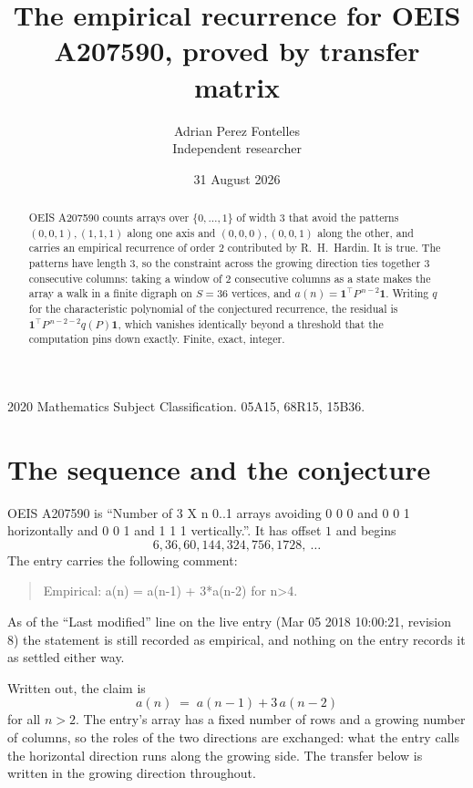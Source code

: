 \documentclass[11pt,a4paper]{article}
\title{The empirical recurrence for OEIS A207590, proved by transfer matrix}
\author{Adrian Perez Fontelles\\ \small Independent researcher}
\date{31 August 2026}
\theoremstyle{plain}
\theoremstyle{definition}
\begin{document}
\maketitle

\begin{abstract}
OEIS A207590 counts arrays over $\{0,\dots,1\}$ of width $3$ that avoid the patterns
$(0,0,1), (1,1,1)$ along one axis and $(0,0,0), (0,0,1)$ along the other, and carries an empirical recurrence of
order $2$ contributed by R.~H.~Hardin. It is true. The patterns have length $3$, so
the constraint across the growing direction ties together $3$ consecutive columns: taking a
window of $2$ consecutive columns as a state makes the array a walk in a finite digraph
on $S=36$ vertices, and $a(n)=\mathbf{1}^{\!\top}P^{\,n-2}\mathbf{1}$. Writing $q$
for the characteristic polynomial of the conjectured recurrence, the residual is
$\mathbf{1}^{\!\top}P^{\,n-2-2}q(P)\mathbf{1}$, which vanishes identically
beyond a threshold that the computation pins down exactly. Finite, exact, integer.
\end{abstract}

\noindent\small 2020 Mathematics Subject Classification. 05A15, 68R15, 15B36.\normalsize

\section{The sequence and the conjecture}

OEIS A207590 is ``Number of 3 X n 0..1 arrays avoiding 0 0 0 and 0 0 1 horizontally and 0 0 1 and 1 1 1 vertically.''. It has offset
$1$ and begins
\[
6, 36, 60, 144, 324, 756, 1728,\ \dots
\]
The entry carries the following comment:
\begin{quote}\small
Empirical: a(n) = a(n-1) + 3*a(n-2) for n>4.
\end{quote}
As of the ``Last modified'' line on the live entry (Mar 05 2018 10:00:21, revision
8) the statement is still recorded as empirical, and nothing on the entry
records it as settled either way.

Written out, the claim is
\begin{equation}\label{eq:conj}
a(n)\;=\;a(n-1) + 3\,a(n-2)
\end{equation}
for all $n>2$. The entry's array has a fixed number of rows and a growing number of
columns, so the roles of the two directions are exchanged: what the entry calls the
horizontal direction runs along the growing side. The transfer below is written in the
growing direction throughout.
\end{document}
